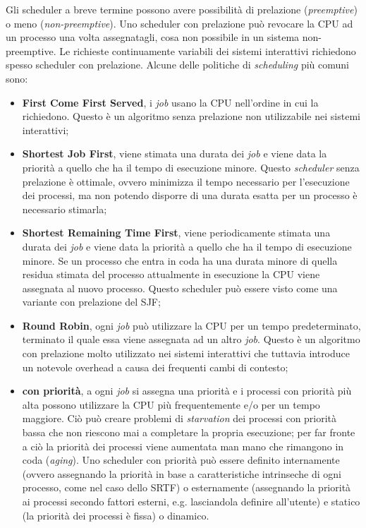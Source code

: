 \documentclass[answers,a4paper,12pt]{exam}
\begin{document}
\begin{questions}
\begin{solutionorlines}[3.8in]
	Gli scheduler a breve termine possono avere possibilità di prelazione (\textit{preemptive}) o meno (\textit{non-preemptive}). Uno scheduler con prelazione può revocare la CPU ad un processo una volta assegnatagli, cosa non possibile in un sistema non-preemptive. Le richieste continuamente variabili dei sistemi interattivi richiedono spesso scheduler con prelazione. Alcune delle politiche di \textit{scheduling} più comuni sono:
\begin{itemize}
	\item \textbf{First Come First Served}, i \textit{job} usano la CPU nell'ordine in cui la richiedono. Questo è un algoritmo senza prelazione non utilizzabile nei sistemi interattivi;
	\item \textbf{Shortest Job First}, viene stimata una durata dei \textit{job} e viene data la priorità a quello che ha il tempo di esecuzione minore. Questo \textit{scheduler} senza prelazione è ottimale, ovvero minimizza il tempo necessario per l'esecuzione dei processi, ma non potendo disporre di una durata esatta per un processo è necessario stimarla;
		\item \textbf{Shortest Remaining Time First}, viene periodicamente stimata una durata dei \textit{job} e viene data la priorità a quello che ha il tempo di esecuzione minore. Se un processo che entra in coda ha una durata minore di quella residua stimata del processo attualmente in esecuzione la CPU viene assegnata al nuovo processo. Questo scheduler può essere visto come una variante con prelazione del SJF;
	\item \textbf{Round Robin}, ogni \textit{job} può utilizzare la CPU per un tempo predeterminato, terminato il quale essa viene assegnata ad un altro \textit{job}. Questo è un algoritmo con prelazione molto utilizzato nei sistemi interattivi che tuttavia introduce un notevole overhead a causa dei frequenti cambi di contesto;
	\item \textbf{con priorità}, a ogni \textit{job} si assegna una priorità e i processi con priorità più alta possono utilizzare la CPU più frequentemente e/o per un tempo maggiore. Ciò può creare problemi di \textit{starvation} dei processi con priorità bassa che non riescono mai a completare la propria esecuzione; per far fronte a ciò la priorità dei processi viene aumentata man mano che rimangono in coda (\textit{aging}). Uno scheduler con priorità può essere definito internamente (ovvero assegnando la priorità in base a caratteristiche intrinseche di ogni processo, come nel caso dello SRTF) o esternamente (assegnando la priorità ai processi secondo fattori esterni, e.g. lasciandola definire all'utente) e statico (la priorità dei processi è fissa) o dinamico.

\end{itemize}
\end{solutionorlines}
\end{questions}
\end{document}
